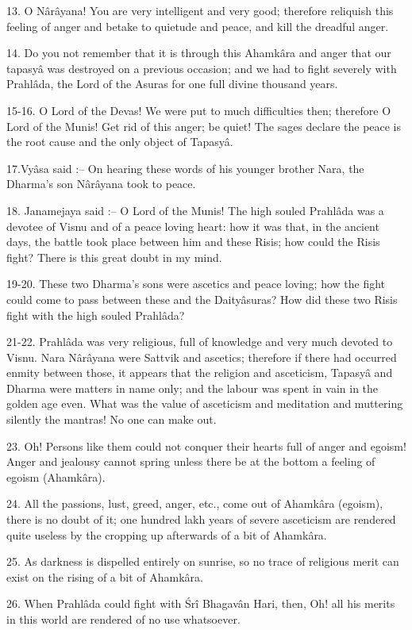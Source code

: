13. O N\^ar\^ayana! You are very intelligent and very good; therefore reliquish this feeling of anger and betake to quietude and peace, and kill the dreadful anger.

14. Do you not remember that it is through this Ahamk\^ara and anger that our tapasy\^a was destroyed on a previous occasion; and we had to fight severely with Prahl\^ada, the Lord of the Asuras for one full divine thousand years.

15-16. O Lord of the Devas! We were put to much difficulties then; therefore O Lord of the Munis! Get rid of this anger; be quiet! The sages declare the peace is the root cause and the only object of Tapasy\^a.

17.Vy\^asa said :-- On hearing these words of his younger brother Nara, the Dharma's son N\^ar\^ayana took to peace.

18. Janamejaya said :-- O Lord of the Munis! The high souled Prahl\^ada was a devotee of Visnu and of a peace loving heart: how it was that, in the ancient days, the battle took place between him and these Risis; how could the Risis fight? There is this great doubt in my mind.

19-20. These two Dharma's sons were ascetics and peace loving; how the fight could come to pass between these and the Daity\^asuras? How did these two Risis fight with the high souled Prahl\^ada?

21-22. Prahl\^ada was very religious, full of knowledge and very much devoted to Visnu. Nara N\^ar\^ayana were Sattvik and ascetics; therefore if there had occurred enmity between those, it appears that the religion and asceticism, Tapasy\^a and Dharma were matters in name only; and the labour was spent in vain in the golden age even. What was the value of asceticism and meditation and muttering silently the mantras! No one can make out.

23. Oh! Persons like them could not conquer their hearts full of anger and egoism! Anger and jealousy cannot spring unless there be at the bottom a feeling of egoism (Ahamk\^ara).

24. All the passions, lust, greed, anger, etc., come out of Ahamk\^ara (egoism), there is no doubt of it; one hundred lakh years of severe asceticism are rendered quite useless by the cropping up afterwards of a bit of Ahamk\^ara.

25. As darkness is dispelled entirely on sunrise, so no trace of religious merit can exist on the rising of a bit of Ahamk\^ara.

26. When Prahl\^ada could fight with \'Sr\^i Bhagav\^an Hari, then, Oh! all his merits in this world are rendered of no use whatsoever.

